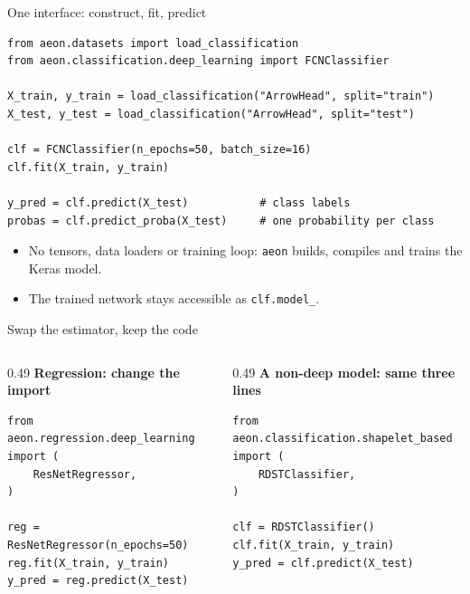 \documentclass[aspectratio=169,10pt]{beamer}
\begin{document}
\begin{frame}[fragile]{One interface: construct, fit, predict}
\begin{lstlisting}
from aeon.datasets import load_classification
from aeon.classification.deep_learning import FCNClassifier

X_train, y_train = load_classification("ArrowHead", split="train")
X_test, y_test = load_classification("ArrowHead", split="test")

clf = FCNClassifier(n_epochs=50, batch_size=16)
clf.fit(X_train, y_train)

y_pred = clf.predict(X_test)           # class labels
probas = clf.predict_proba(X_test)     # one probability per class
\end{lstlisting}
  \vspace{0.1cm}
  \begin{itemize}
    \item No tensors, data loaders or training loop: \texttt{aeon} builds, compiles and trains the Keras model.
    \item The trained network stays accessible as \texttt{clf.model\_}.
  \end{itemize}
\end{frame}

\begin{frame}[fragile]{Swap the estimator, keep the code}
  \begin{columns}[t]
    \begin{column}{0.49\textwidth}
      \textbf{Regression: change the import}
\begin{lstlisting}
from aeon.regression.deep_learning import (
    ResNetRegressor,
)

reg = ResNetRegressor(n_epochs=50)
reg.fit(X_train, y_train)
y_pred = reg.predict(X_test)
\end{lstlisting}
    \end{column}
    \begin{column}{0.49\textwidth}
      \textbf{A non-deep model: same three lines}
\begin{lstlisting}
from aeon.classification.shapelet_based import (
    RDSTClassifier,
)

clf = RDSTClassifier()
clf.fit(X_train, y_train)
y_pred = clf.predict(X_test)
\end{lstlisting}
    \end{column}
  \end{columns}
  \vspace{0.2cm}
\end{frame}
\end{document}
